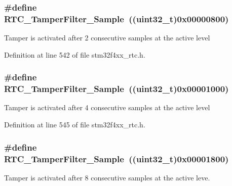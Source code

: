 \hypertarget{group___r_t_c___tamper___filter___definitions_gae036968e2f4d9ed7d71587df94bd2f41}{
\subsubsection[{R\-T\-C\-\_\-\-Tamper\-Filter\-\_\-2\-Sample}]{\setlength{\rightskip}{0pt plus 5cm}\#define R\-T\-C\-\_\-\-Tamper\-Filter\-\_\-Sample~((uint32\-\_\-t)0x00000800)}}\label{group___r_t_c___tamper___filter___definitions_gae036968e2f4d9ed7d71587df94bd2f41}
Tamper is activated after 2 consecutive samples at the active level 

Definition at line 542 of file stm32f4xx\-\_\-rtc.\-h.

\hypertarget{group___r_t_c___tamper___filter___definitions_ga1d36f9a5326a4ed71de0f28365ee65e6}{
\subsubsection[{R\-T\-C\-\_\-\-Tamper\-Filter\-\_\-4\-Sample}]{\setlength{\rightskip}{0pt plus 5cm}\#define R\-T\-C\-\_\-\-Tamper\-Filter\-\_\-Sample~((uint32\-\_\-t)0x00001000)}}\label{group___r_t_c___tamper___filter___definitions_ga1d36f9a5326a4ed71de0f28365ee65e6}
Tamper is activated after 4 consecutive samples at the active level 

Definition at line 545 of file stm32f4xx\-\_\-rtc.\-h.

\hypertarget{group___r_t_c___tamper___filter___definitions_gae84bc688a4eca9fd17ece6df6436c9ca}{
\subsubsection[{R\-T\-C\-\_\-\-Tamper\-Filter\-\_\-8\-Sample}]{\setlength{\rightskip}{0pt plus 5cm}\#define R\-T\-C\-\_\-\-Tamper\-Filter\-\_\-Sample~((uint32\-\_\-t)0x00001800)}}\label{group___r_t_c___tamper___filter___definitions_gae84bc688a4eca9fd17ece6df6436c9ca}
Tamper is activated after 8 consecutive samples at the active leve. 

